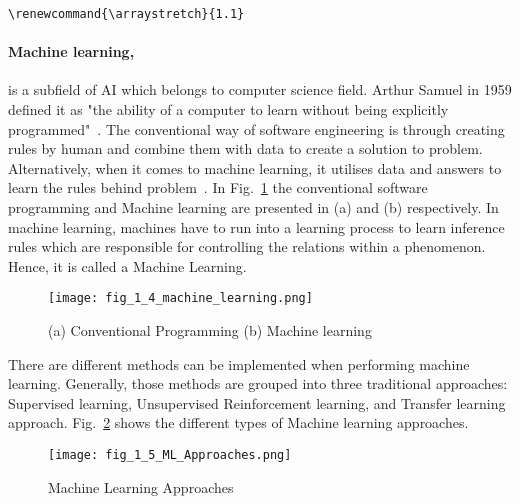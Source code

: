 
\verb+\renewcommand{\arraystretch}{1.1}+
\paragraph{Machine learning,}
is a subfield of AI which belongs to computer science field. 
Arthur Samuel in 1959 defined it as "the ability of a computer to learn without being explicitly programmed"~\cite{munoz2014machine}.
The conventional way of software engineering is through creating rules by human and combine them with data to create a solution to  problem.
Alternatively, when it comes to machine learning, it utilises data and answers to learn the rules behind   problem~\cite{franoischollet2017learning}.
In Fig.~\ref{fig:Machine_learning} the conventional software programming and Machine learning are presented in (a) and (b) respectively.
In machine learning, machines have to run into a learning process to learn inference rules which are responsible for controlling the relations within a phenomenon. Hence, it is called a Machine Learning.

\begin{figure} [h!]
	\begin{center}
		\centering
	\texttt{[image: fig\_1\_4\_machine\_learning.png]}
	\end{center}
	
\caption{(a) Conventional Programming	(b) Machine learning}
 
	\label{fig:Machine_learning}
\end{figure}

There are different methods  can be implemented when performing machine learning. 
Generally, those methods are grouped into three traditional approaches: Supervised learning, Unsupervised   Reinforcement learning, and  Transfer learning approach.
Fig.~\ref{fig:Machine_learning_approaches} shows the different types of Machine learning approaches.

\begin{figure} [h!]
	\begin{center}
		\centering
	\texttt{[image: fig\_1\_5\_ML\_Approaches.png]}
	\end{center}
	
\caption{Machine Learning Approaches}
 
	\label{fig:Machine_learning_approaches}
\end{figure}

